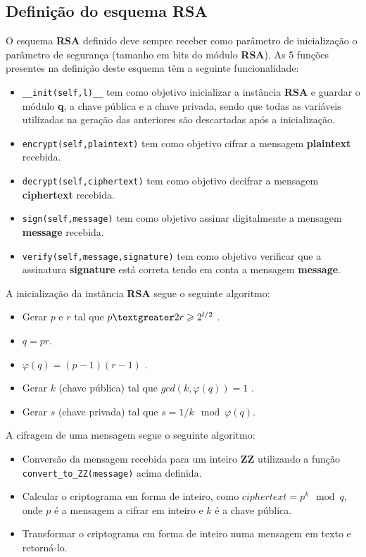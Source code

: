 \documentclass[11pt]{article}
\providecommand{\tightlist}{%
      \setlength{\itemsep}{0pt}\setlength{\parskip}{0pt}}
\begin{document}
    \subsection{Definição do esquema
RSA}\label{definiuxe7uxe3o-do-esquema-rsa}

    O esquema \textbf{RSA} definido deve sempre receber como parâmetro de
inicialização o parâmetro de segurança (tamanho em bits do módulo
\textbf{RSA}). As 5 funções presentes na definição deste esquema têm a
seguinte funcionalidade:

\begin{itemize}
\tightlist
\item
  \texttt{\_\_init(self,l)\_\_} tem como objetivo inicializar a
  instância \textbf{RSA} e guardar o módulo \textbf{q}, a chave pública
  e a chave privada, sendo que todas as variáveis utilizadas na geração
  das anteriores são descartadas após a inicialização.
\item
  \texttt{encrypt(self,plaintext)} tem como objetivo cifrar a mensagem
  \textbf{plaintext} recebida.
\item
  \texttt{decrypt(self,ciphertext)} tem como objetivo decifrar a
  mensagem \textbf{ciphertext} recebida.
\item
  \texttt{sign(self,message)} tem como objetivo assinar digitalmente a
  mensagem \textbf{message} recebida.
\item
  \texttt{verify(self,message,signature)} tem como objetivo verificar
  que a assinatura \textbf{signature} está correta tendo em conta a
  mensagem \textbf{message}.
\end{itemize}

A inicialização da instância \textbf{RSA} segue o seguinte algoritmo:

\begin{itemize}
\tightlist
\item
  Gerar $p$ e $r$ tal que $p \textgreater 2r \geqslant 2^{l/2}$ .
\item
  $ q = pr $.
\item
  $ \varphi (q) = (p-1) (r-1) $ .
\item
  Gerar $k$ (chave pública) tal que $ gcd(k,\varphi(q)) = 1 $ .
\item
  Gerar $s$ (chave privada) tal que $ s = 1/k \mod \varphi(q) $.
\end{itemize}

A cifragem de uma mensagem segue o seguinte algoritmo:

\begin{itemize}
\tightlist
\item
  Conversão da mensagem recebida para um inteiro \textbf{ZZ} utilizando
  a função \texttt{convert\_to\_ZZ(message)} acima definida.
\item
  Calcular o criptograma em forma de inteiro, como $ ciphertext =
  p^{k} \mod q $, onde $p$ é a mensagem a cifrar em inteiro e $k$ é a
  chave pública.
\item
  Transformar o criptograma em forma de inteiro numa mensagem em texto e
  retorná-lo.
\end{itemize}
\end{document}
